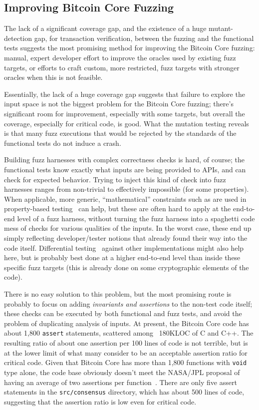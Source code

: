 \subsection{Improving Bitcoin Core Fuzzing}

The lack of a significant coverage gap, and the existence of a huge
mutant-detection gap, for transaction verification, between the fuzzing and the functional tests
suggests the most promising method for improving the Bitcoin Core
fuzzing: manual, expert developer effort to improve the
oracles used by existing fuzz targets, or efforts to craft custom,
more restricted, fuzz targets with stronger oracles when this is not
feasible.

Essentially, the lack of a huge coverage gap suggests that failure to
explore the input space is not the biggest problem for the Bitcoin
Core fuzzing; there's significant room for improvement, especially
with some targets, but overall the coverage, especially for critical
code, is good.  What the mutation testing reveals is that many fuzz
executions that would be rejected by the standards of the functional
tests do not induce a crash.

Building fuzz harnesses with complex correctness checks is hard, of
course; the functional tests know exactly what inputs are being
provided to APIs, and can check for expected behavior.  Trying to
inject this kind of check into fuzz harnesses ranges from non-trivial
to effectively impossible (for some properties).  When
applicable, more generic, ``mathematical'' constraints such as are
used in property-based testing~\cite{ClaessenH00} can help, but these
are often hard to apply at the end-to-end level of a fuzz harness,
without turning the fuzz harness into a spaghetti code mess of
checks for various qualities of the inputs.  In the worst case, these
end up simply reflecting developer/tester notions that already found
their way into the code itself.  Differential testing~\cite{Differential} against other
implementations might also help here, but is probably best done at a
higher end-to-end level than inside these specific fuzz targets (this
is already done on some cryptographic elements of the code).

There is no
easy solution to this problem, but the most promising route is
probably to focus
on adding \emph{invariants and assertions} to the non-test code itself; these checks can be executed by
both functional and fuzz tests, and avoid the problem of duplicating
analysis of inputs.  At
present, the Bitcoin Core code has about 1,800 {\tt assert}
statements, scattered among  ~180KLOC of C and C++.  The resulting ratio
of about one assertion per 100 lines of code is not terrible, but is
at the lower limit of what many consider to be an acceptable assertion
ratio for critical code.
Given that Bitcoin Core has more than 1,800 functions with {\tt void}
type alone, the code base obviously
doesn't meet the NASA/JPL proposal of having an average of two
assertions per function~\cite{holzmann2006power}.  There are only five assert
statements in the {\tt src/consensus} directory, which has about 500
lines of code, suggesting that the assertion ratio is low even for
critical code.

